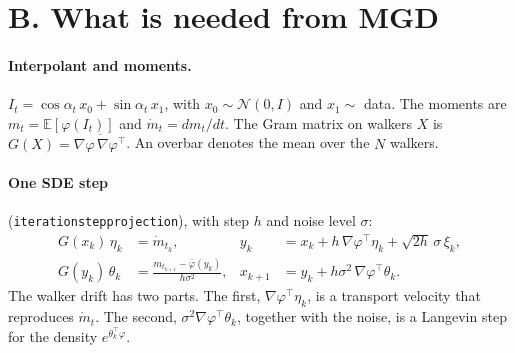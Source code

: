 \documentclass[11pt]{article}
\newcommand{\E}{\mathbb{E}}
\newcommand{\code}[1]{\texttt{#1}}
\renewcommand{\_}{\origunderscore\allowbreak}
\begin{document}
\section{B. What is needed from MGD}
\label{sec:B}

\paragraph{Interpolant and moments.} $I_t=\cos\alpha_t\,x_0+\sin\alpha_t\,x_1$,
with $x_0\sim\mathcal N(0,I)$ and $x_1\sim$ data. The moments are
$m_t=\E[\varphi(I_t)]$ and $\dot m_t=dm_t/dt$. The Gram matrix on walkers $X$ is
$G(X)=\overline{\nabla\varphi\,\nabla\varphi^\top}$. An overbar denotes the
mean over the $N$ walkers.

\paragraph{One SDE step} (\code{iteration\_step\_projection}), with step
$h$ and noise level $\sigma$:
\begin{align}
  G(x_k)\,\eta_k&=\dot m_{t_k}, &
  y_k&=x_k+h\,\nabla\varphi^\top\eta_k+\sqrt{2h}\,\sigma\,\xi_k, \label{eq:B-pred}\\
  G(y_k)\,\theta_k&=\frac{m_{t_{k+1}}-\bar\varphi(y_k)}{h\sigma^2}, &
  x_{k+1}&=y_k+h\sigma^2\,\nabla\varphi^\top\theta_k . \label{eq:B-corr}
\end{align}
The walker drift has two parts. The first, $\nabla\varphi^\top\eta_k$, is a
transport velocity that reproduces $\dot m_t$. The second,
$\sigma^2\nabla\varphi^\top\theta_k$, together with the noise, is a Langevin
step for the density $e^{\theta_k^\top\varphi}$.
\end{document}
